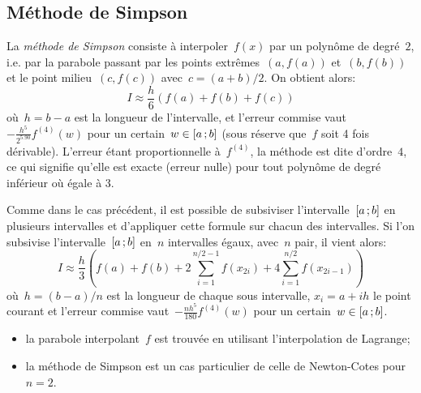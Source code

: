 \subsection{Méthode de Simpson} 
La \emph{méthode de Simpson} consiste à interpoler~$f(x)$ par un polynôme de degré~$2$, i.e. par la parabole passant par les points extrêmes~$(a,f(a))$ et~$(b,f(b))$ et le point milieu~$(c,f(c))$ avec~$c=(a+b)/2$. On obtient alors: 
\begin{equation}
 I\approx \frac{h}{6} \left( f(a)+f(b)+f(c)\right)
\end{equation}
où~$h=b-a$ est la longueur de l'intervalle, et l'erreur commise vaut~$-\frac{h^5}{2^5.90} f^{(4)}(w)$ pour un certain~$w\in\mathopen{[}a\,;b\mathclose{]}$ (sous réserve que~$f$ soit 4 fois dérivable). L'erreur étant proportionnelle à~$f^{(4)}$, la méthode est dite d'ordre~$4$, ce qui signifie qu'elle est exacte (erreur nulle) pour tout polynôme de degré inférieur où égale à 3. 

Comme dans le cas précédent, il est possible de subsiviser l'intervalle~$\mathopen{[}a\,;b\mathclose{]}$ en plusieurs intervalles et d'appliquer cette formule sur chacun des intervalles. Si l'on subsivise l'intervalle~$\mathopen{[}a\,;b\mathclose{]}$ en~$n$ intervalles égaux, avec~$n$ pair, il vient alors: 
\begin{equation}
 I\approx \frac{h}{3} \left( f(a)+f(b)+2\sum_{i=1}^{n/2-1}f(x_{2i})+4\sum_{i=1}^{n/2}f(x_{2i-1}) \right)
\end{equation}
où~$h=(b-a)/n$ est la longueur de chaque sous intervalle, $x_i=a+ih$ le point courant et l'erreur commise vaut~$-\frac{nh^5}{180} f^{(4)}(w)$ pour un certain~$w\in\mathopen{[}a\,;b\mathclose{]}$. 
\begin{remarque}[Remarques]\mbox{}
\begin{itemize}
\item la parabole interpolant~$f$ est trouvée en utilisant l'interpolation de Lagrange; 
\item la méthode de Simpson est un cas particulier de celle de Newton-Cotes pour~$n=2$. 
\end{itemize}
\end{remarque}
